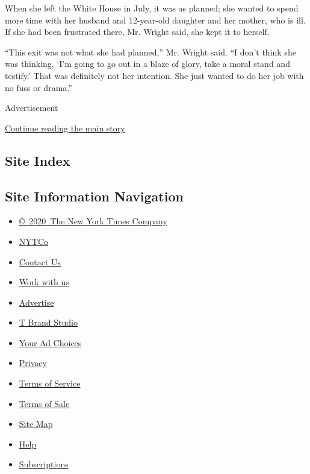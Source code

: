 When she left the White House in July, it was as planned; she wanted to
spend more time with her husband and 12-year-old daughter and her
mother, who is ill. If she had been frustrated there, Mr. Wright said,
she kept it to herself.

``This exit was not what she had planned,'' Mr. Wright said. ``I don't
think she was thinking, `I'm going to go out in a blaze of glory, take a
moral stand and testify.' That was definitely not her intention. She
just wanted to do her job with no fuss or drama.''

Advertisement

\protect\hyperlink{after-bottom}{Continue reading the main story}

\hypertarget{site-index}{%
\subsection{Site Index}\label{site-index}}

\hypertarget{site-information-navigation}{%
\subsection{Site Information
Navigation}\label{site-information-navigation}}

\begin{itemize}
\tightlist
\item
  \href{https://help.nytimes3xbfgragh.onion/hc/en-us/articles/115014792127-Copyright-notice}{©~2020~The
  New York Times Company}
\end{itemize}

\begin{itemize}
\tightlist
\item
  \href{https://www.nytco.com/}{NYTCo}
\item
  \href{https://help.nytimes3xbfgragh.onion/hc/en-us/articles/115015385887-Contact-Us}{Contact
  Us}
\item
  \href{https://www.nytco.com/careers/}{Work with us}
\item
  \href{https://nytmediakit.com/}{Advertise}
\item
  \href{http://www.tbrandstudio.com/}{T Brand Studio}
\item
  \href{https://www.nytimes3xbfgragh.onion/privacy/cookie-policy\#how-do-i-manage-trackers}{Your
  Ad Choices}
\item
  \href{https://www.nytimes3xbfgragh.onion/privacy}{Privacy}
\item
  \href{https://help.nytimes3xbfgragh.onion/hc/en-us/articles/115014893428-Terms-of-service}{Terms
  of Service}
\item
  \href{https://help.nytimes3xbfgragh.onion/hc/en-us/articles/115014893968-Terms-of-sale}{Terms
  of Sale}
\item
  \href{https://spiderbites.nytimes3xbfgragh.onion}{Site Map}
\item
  \href{https://help.nytimes3xbfgragh.onion/hc/en-us}{Help}
\item
  \href{https://www.nytimes3xbfgragh.onion/subscription?campaignId=37WXW}{Subscriptions}
\end{itemize}
